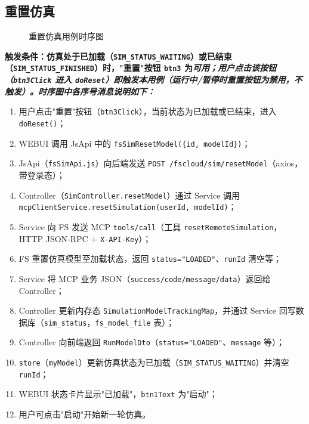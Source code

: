 \subsection{重置仿真}
\begin{figure}[!h]
	\centering
	\resizebox{1.0\linewidth}{!}{}
	\caption{重置仿真用例时序图}\label{fig:resetModel}
\end{figure}
\bf{触发条件}：仿真处于已加载（\texttt{SIM\_STATUS\_WAITING}）或已结束（\texttt{SIM\_STATUS\_FINISHED}）时，"重置"按钮 \texttt{btn3} 为\it{可用}；用户点击该按钮（\texttt{btn3Click} 进入 \texttt{doReset}）即触发本用例（运行中/暂停时重置按钮为禁用，不触发）。时序图中各序号消息说明如下：
\begin{enumerate}[label=\arabic*)]
	\item 用户点击"重置"按钮（\texttt{btn3Click}），当前状态为已加载或已结束，进入 \texttt{doReset()}；
	\item WEBUI 调用 JsApi 中的 \texttt{fsSimResetModel(\{id, modelId\})}；
	\item JsApi（\texttt{fsSimApi.js}）向后端发送 \texttt{POST /fscloud/sim/resetModel}（axios，带登录态）；
	\item Controller（\texttt{SimController.resetModel}）通过 Service 调用 \texttt{mcpClientService.resetSimulation(userId, modelId)}；
	\item Service 向 FS 发送 MCP \texttt{tools/call}（工具 \texttt{resetRemoteSimulation}，HTTP JSON-RPC + \texttt{X-API-Key}）；
	\item FS 重置仿真模型至加载状态，返回 \texttt{status="LOADED"}、\texttt{runId} 清空等；
	\item Service 将 MCP 业务 JSON（\texttt{success/code/message/data}）返回给 Controller；
	\item Controller 更新内存态 \texttt{SimulationModelTrackingMap}，并通过 Service 回写数据库（\texttt{sim\_status}，\texttt{fs\_model\_file} 表）；
	\item Controller 向前端返回 \texttt{RunModelDto}（\texttt{status="LOADED"}、\texttt{message} 等）；
	\item \texttt{store}（\texttt{myModel}）更新仿真状态为已加载（\texttt{SIM\_STATUS\_WAITING}）并清空 \texttt{runId}；
	\item WEBUI 状态卡片显示"已加载"，\texttt{btn1Text} 为"启动"；
	\item 用户可点击"启动"开始新一轮仿真。
\end{enumerate}
\newpage
